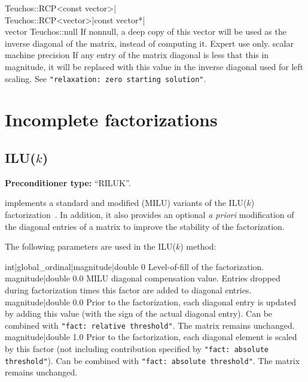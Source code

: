     {Teuchos::RCP<const vector>|\\Teuchos::RCP<vector>|const vector*|\\vector}
    {Teuchos::null}
    {If nonnull, a deep copy of this vector will be used as the inverse
     diagonal of the matrix, instead of computing it. Expert use only.}
    {scalar}
    {machine precision}
    {If any entry of the matrix diagonal is less that this in magnitude, it will
     be replaced with this value in the inverse diagonal used for left scaling.}
    {See {\tt "relaxation: zero starting solution"}.}

\section{Incomplete factorizations}

\subsection{ILU($k$)}\label{s:ILU}

\textbf{Preconditioner type:} ``RILUK''.

\ifpacktwo{} implements a standard and modified (MILU) variants of the
ILU($k$) factorization~\cite{Saad2003}. In addition, it also provides an
optional \textit{a priori} modification of the diagonal entries of a matrix to
improve the stability of the factorization.

The following parameters are used in the ILU($k$) method:

    {int|global\_ordinal|magnitude|double}
    {0}
    {Level-of-fill of the factorization.}
    {magnitude|double}
    {0.0}
    {MILU diagonal compensation value. Entries dropped during factorization
     times this factor are added to diagonal entries.}
    {magnitude|double}
    {0.0}
    {Prior to the factorization, each diagonal entry is updated by adding
     this value (with the sign of the actual diagonal entry). Can be combined
     with {\tt "fact: relative threshold"}. The matrix remains unchanged.}
    {magnitude|double}
    {1.0}
    {Prior to the factorization, each diagonal element is scaled by this factor
     (not including contribution specified by {\tt "fact: absolute
     threshold"}). Can be combined with {\tt "fact: absolute threshold"}.
     The matrix remains unchanged.}
%
%
%
%

